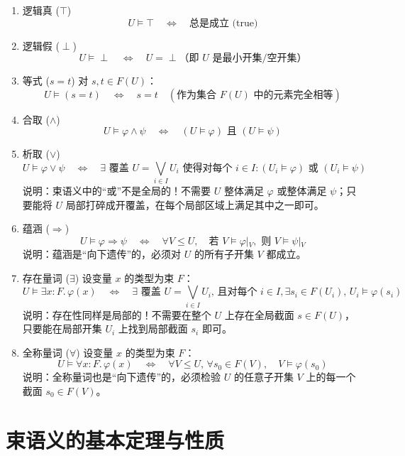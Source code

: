 \documentclass[12pt,a4paper]{article}
\begin{document}
\begin{enumerate}
  \item 逻辑真 ($\top$)
  \[
  U \models \top \quad \iff \quad \text{总是成立 (true)}
  \]

  \item 逻辑假 ($\perp$)
  \[
  U \models \perp \quad \iff \quad U = \perp \text{（即 } U \text{ 是最小开集/空开集）}
  \]

  \item 等式 ($s = t$)
  对 $s, t \in F(U)$：
  \[
  U \models (s = t) \quad \iff \quad s = t \quad (\text{作为集合 } F(U) \text{ 中的元素完全相等})
  \]

  \item 合取 ($\wedge$)
  \[
  U \models \varphi \wedge \psi \quad \iff \quad (U \models \varphi) \text{ 且 } (U \models \psi)
  \]

  \item 析取 ($\vee$)
  \[
  U \models \varphi \vee \psi \quad \iff \quad \exists \text{ 覆盖 } U = \bigvee_{i \in I} U_i \text{ 使得对每个 } i \in I: (U_i \models \varphi) \text{ 或 } (U_i \models \psi)
  \]
  说明：束语义中的“或”不是全局的！不需要 $U$ 整体满足 $\varphi$ 或整体满足 $\psi$；只要能将 $U$ 局部打碎成开覆盖，在每个局部区域上满足其中之一即可。

  \item 蕴涵 ($\Rightarrow$)
  \[
  U \models \varphi \Rightarrow \psi \quad \iff \quad \forall V \le U, \quad \text{若 } V \models \varphi\vert{}_V, \text{ 则 } V \models \psi\vert{}_V
  \]
  说明：蕴涵是“向下遗传”的，必须对 $U$ 的所有子开集 $V$ 都成立。

  \item 存在量词 ($\exists$)
  设变量 $x$ 的类型为束 $F$：
  \[
  U \models \exists x : F. \, \varphi(x) \quad \iff \quad \exists \text{ 覆盖 } U = \bigvee_{i \in I} U_i, \, \text{且对每个 } i \in I, \exists s_i \in F(U_i), \, U_i \models \varphi(s_i)
  \]
  说明：存在性同样是局部的！不需要在整个 $U$ 上存在全局截面 $s \in F(U)$，只要能在局部开集 $U_i$ 上找到局部截面 $s_i$ 即可。

  \item 全称量词 ($\forall$)
  设变量 $x$ 的类型为束 $F$：
  \[
  U \models \forall x : F. \, \varphi(x) \quad \iff \quad \forall V \le U, \, \forall s_0 \in F(V), \quad V \models \varphi(s_0)
  \]
  说明：全称量词也是“向下遗传”的，必须检验 $U$ 的任意子开集 $V$ 上的每一个截面 $s_0 \in F(V)$。
\end{enumerate}

\section{束语义的基本定理与性质}
\end{document}

